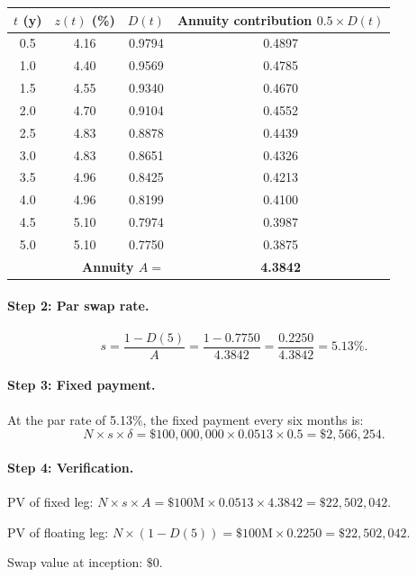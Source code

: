 \begin{center}
\begin{tabular}{cccc}
\toprule
$t$ (y) & $z(t)$ (\%) & $D(t)$ & Annuity contribution
  $0.5 \times D(t)$ \\
\midrule
0.5 & 4.16 & 0.9794 & 0.4897 \\
1.0 & 4.40 & 0.9569 & 0.4785 \\
1.5 & 4.55 & 0.9340 & 0.4670 \\
2.0 & 4.70 & 0.9104 & 0.4552 \\
2.5 & 4.83 & 0.8878 & 0.4439 \\
3.0 & 4.83 & 0.8651 & 0.4326 \\
3.5 & 4.96 & 0.8425 & 0.4213 \\
4.0 & 4.96 & 0.8199 & 0.4100 \\
4.5 & 5.10 & 0.7974 & 0.3987 \\
5.0 & 5.10 & 0.7750 & 0.3875 \\
\midrule
\multicolumn{3}{r}{\textbf{Annuity $A =$}} & \textbf{4.3842} \\
\bottomrule
\end{tabular}
\end{center}

\paragraph{Step 2: Par swap rate.}
\begin{equation}
  s = \frac{1 - D(5)}{A}
    = \frac{1 - 0.7750}{4.3842}
    = \frac{0.2250}{4.3842}
    = 5.13\%.
  \label{eq:par_rate_example}
\end{equation}

\paragraph{Step 3: Fixed payment.}
At the par rate of 5.13\%, the fixed payment every six months is:
\[
  N \times s \times \delta
  = \$100{,}000{,}000 \times 0.0513 \times 0.5 = \$2{,}566{,}254.
\]

\paragraph{Step 4: Verification.}
PV of fixed leg:
$N \times s \times A = \$100\text{M} \times 0.0513 \times 4.3842 =
\$22{,}502{,}042$.

PV of floating leg:
$N \times (1 - D(5)) = \$100\text{M} \times 0.2250 =
\$22{,}502{,}042$.

Swap value at inception: $\$0$.  \checkmark

